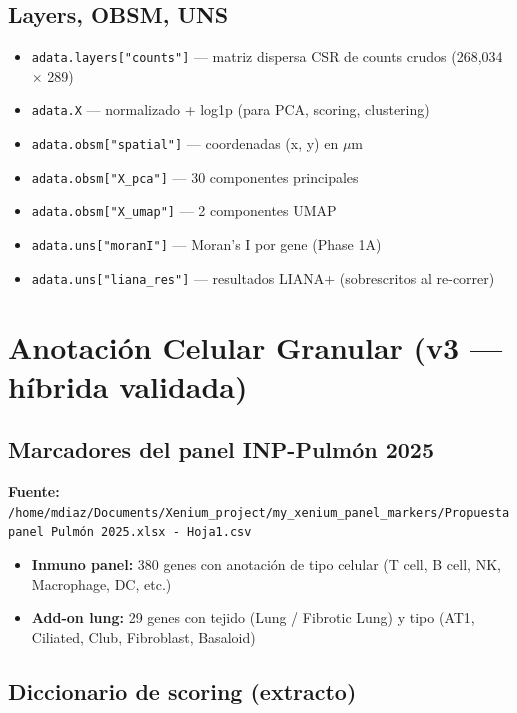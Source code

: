 \documentclass[11pt,a4paper]{article}
\begin{document}
\subsection{Layers, OBSM, UNS}

\begin{itemize}[leftmargin=*]
\item \texttt{adata.layers["counts"]} --- matriz dispersa CSR de counts crudos (268{,}034 × 289)
\item \texttt{adata.X} --- normalizado + log1p (para PCA, scoring, clustering)
\item \texttt{adata.obsm["spatial"]} --- coordenadas (x, y) en \(\mu\)m
\item \texttt{adata.obsm["X\_pca"]} --- 30 componentes principales
\item \texttt{adata.obsm["X\_umap"]} --- 2 componentes UMAP
\item \texttt{adata.uns["moranI"]} --- Moran's I por gene (Phase 1A)
\item \texttt{adata.uns["liana\_res"]} --- resultados LIANA+ (sobrescritos al re-correr)
\end{itemize}

\newpage
\section{Anotación Celular Granular (v3 — híbrida validada)}

\subsection{Marcadores del panel INP-Pulmón 2025}

\textbf{Fuente:} \texttt{\small /home/mdiaz/Documents/Xenium\_project/my\_xenium\_panel\_markers/Propuesta panel Pulmón 2025.xlsx - Hoja1.csv}

\begin{itemize}[leftmargin=*]
\item \textbf{Inmuno panel:} 380 genes con anotación de tipo celular (T cell, B cell, NK, Macrophage, DC, etc.)
\item \textbf{Add-on lung:} 29 genes con tejido (Lung / Fibrotic Lung) y tipo (AT1, Ciliated, Club, Fibroblast, Basaloid)
\end{itemize}

\subsection{Diccionario de scoring (extracto)}
\end{document}
